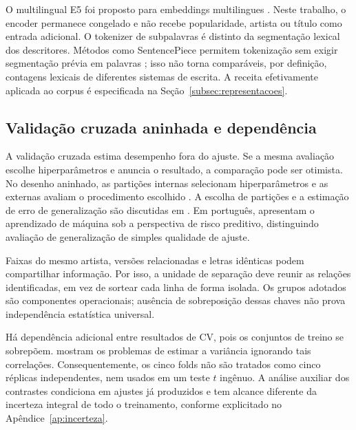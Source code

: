 O multilingual E5 foi proposto para embeddings multilingues \cite{wang2024}. Neste trabalho, o encoder permanece congelado e não recebe popularidade, artista ou título como entrada adicional. O tokenizer de subpalavras é distinto da segmentação lexical dos descritores. Métodos como SentencePiece permitem tokenização sem exigir segmentação prévia em palavras \cite{kudo2018}; isso não torna comparáveis, por definição, contagens lexicais de diferentes sistemas de escrita. A receita efetivamente aplicada ao corpus é especificada na Seção~\ref{subsec:representacoes}.

\subsection{Validação cruzada aninhada e dependência}
A validação cruzada estima desempenho fora do ajuste. Se a mesma avaliação escolhe hiperparâmetros e anuncia o resultado, a comparação pode ser otimista. No desenho aninhado, as partições internas selecionam hiperparâmetros e as externas avaliam o procedimento escolhido \cite{cawley2010}. A escolha de partições e a estimação de erro de generalização são discutidas em . Em português,  apresentam o aprendizado de máquina sob a perspectiva de risco preditivo, distinguindo avaliação de generalização de simples qualidade de ajuste.

Faixas do mesmo artista, versões relacionadas e letras idênticas podem compartilhar informação. Por isso, a unidade de separação deve reunir as relações identificadas, em vez de sortear cada linha de forma isolada. Os grupos adotados são componentes operacionais; ausência de sobreposição dessas chaves não prova independência estatística universal.

Há dependência adicional entre resultados de CV, pois os conjuntos de treino se sobrepõem.  mostram os problemas de estimar a variância ignorando tais correlações. Consequentemente, os cinco folds não são tratados como cinco réplicas independentes, nem usados em um teste $t$ ingênuo. A análise auxiliar dos contrastes condiciona em ajustes já produzidos e tem alcance diferente da incerteza integral de todo o treinamento, conforme explicitado no Apêndice~\ref{ap:incerteza}.
